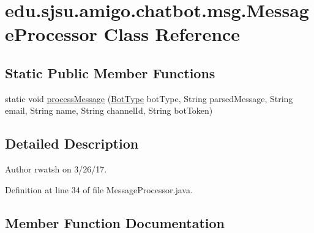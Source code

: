 \hypertarget{classedu_1_1sjsu_1_1amigo_1_1chatbot_1_1msg_1_1_message_processor}{}\section{edu.\+sjsu.\+amigo.\+chatbot.\+msg.\+Message\+Processor Class Reference}
\label{classedu_1_1sjsu_1_1amigo_1_1chatbot_1_1msg_1_1_message_processor}
\subsection*{Static Public Member Functions}
\begin{DoxyCompactItemize}
\item 
static void \hyperlink{classedu_1_1sjsu_1_1amigo_1_1chatbot_1_1msg_1_1_message_processor_a0e027defe95a850441011579ee87374a}{process\+Message} (\hyperlink{enumedu_1_1sjsu_1_1amigo_1_1mp_1_1util_1_1_bot_type}{Bot\+Type} bot\+Type, String parsed\+Message, String email, String name, String channel\+Id, String bot\+Token)
\end{DoxyCompactItemize}


\subsection{Detailed Description}
\begin{DoxyAuthor}{Author}
rwatsh on 3/26/17. 
\end{DoxyAuthor}


Definition at line 34 of file Message\+Processor.\+java.



\subsection{Member Function Documentation}
\mbox{\label{classedu_1_1sjsu_1_1amigo_1_1chatbot_1_1msg_1_1_message_processor_a0e027defe95a850441011579ee87374a}} 
